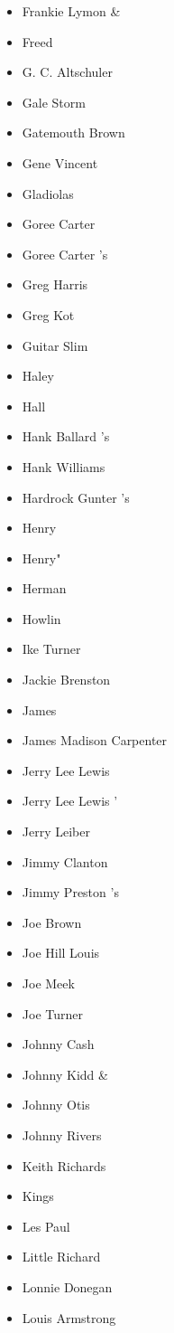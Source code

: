 \documentclass[12pt,a4paper]{article}
\begin{document}
\begin{itemize}
  \item Frankie Lymon \&
  \item Freed
  \item G. C. Altschuler
  \item Gale Storm
  \item Gatemouth Brown
  \item Gene Vincent
  \item Gladiolas
  \item Goree Carter
  \item Goree Carter 's
  \item Greg Harris
  \item Greg Kot
  \item Guitar Slim
  \item Haley
  \item Hall
  \item Hank Ballard 's
  \item Hank Williams
  \item Hardrock Gunter 's
  \item Henry
  \item Henry"
  \item Herman
  \item Howlin
  \item Ike Turner
  \item Jackie Brenston
  \item James
  \item James Madison Carpenter
  \item Jerry Lee Lewis
  \item Jerry Lee Lewis '
  \item Jerry Leiber
  \item Jimmy Clanton
  \item Jimmy Preston 's
  \item Joe Brown
  \item Joe Hill Louis
  \item Joe Meek
  \item Joe Turner
  \item Johnny Cash
  \item Johnny Kidd \&
  \item Johnny Otis
  \item Johnny Rivers
  \item Keith Richards
  \item Kings
  \item Les Paul
  \item Little Richard
  \item Lonnie Donegan
  \item Louis Armstrong

\end{itemize}
\end{document}
